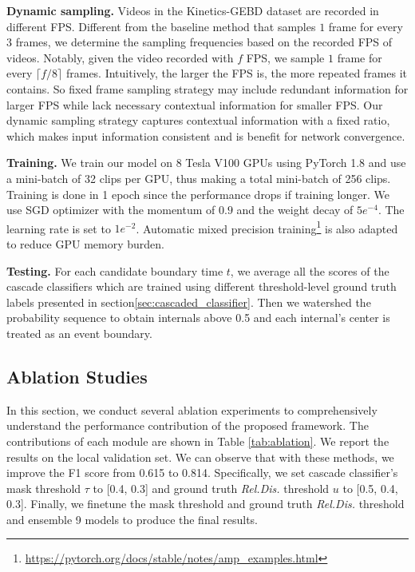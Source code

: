 \documentclass[final]{cvpr}
\begin{document}
\textbf{Dynamic sampling.} Videos in the Kinetics-GEBD dataset are recorded in different FPS. Different from the baseline method that samples $1$ frame for every $3$ frames, we determine the sampling frequencies based on the recorded FPS of videos. Notably, given the video recorded with $f$ FPS, we sample $1$ frame for every $\lceil{f/8}\rceil$ frames. Intuitively, the larger the FPS is, the more repeated frames it contains. So fixed frame sampling strategy may include redundant information for larger FPS while lack necessary contextual information for smaller FPS. Our dynamic sampling strategy captures contextual information with a fixed ratio, which makes input information consistent and is benefit for network convergence.

\textbf{Training.} We train our model on 8 Tesla V100 GPUs using PyTorch 1.8 and use a mini-batch of 32 clips per GPU, thus making a total mini-batch of 256 clips. Training is done in 1 epoch since the performance drops if training longer.  We use SGD optimizer with the momentum of $0.9$ and the weight decay of $5e^{-4}$. The learning rate is set to $1e^{-2}$. Automatic mixed precision training\footnote{\url{https://pytorch.org/docs/stable/notes/amp_examples.html}} is also adapted to reduce GPU memory burden.

\textbf{Testing.} For each candidate boundary time $t$, we average all the scores of the cascade classifiers which are trained using different threshold-level ground truth labels presented in section\ref{sec:cascaded_classifier}. Then we watershed the probability sequence to obtain internals above 0.5 and each internal’s center is treated as an event boundary.

\subsection{Ablation Studies}
In this section, we conduct several ablation experiments to comprehensively understand the performance contribution of the proposed framework. The contributions of each module are shown in Table \ref{tab:ablation}. We report the results on the local validation set. We can observe that with these methods, we improve the F1 score from 0.615 to 0.814. Specifically, we set cascade classifier's mask threshold $\tau$ to [0.4, 0.3] and ground truth \textit{Rel.Dis.} threshold $u$ to [0.5, 0.4, 0.3]. Finally, we finetune the mask threshold and ground truth \textit{Rel.Dis.} threshold and ensemble 9 models to produce the final results.
\end{document}
